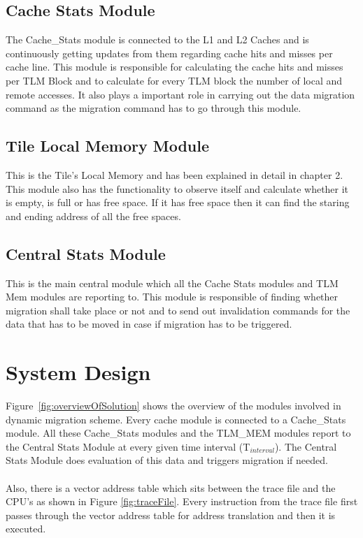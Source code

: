 \documentclass{listhesis}
\begin{document}
\subsection{Cache Stats Module}
The Cache{\_}Stats module is connected to the L1 and L2 Caches and is continuously getting updates from them regarding cache hits and misses per cache line. This module is responsible for calculating the cache hits and misses per TLM Block and to calculate for every TLM block the number of local and remote accesses. It also plays a important role in carrying out the data migration command as the migration command has to go through this module. 
\subsection{Tile Local Memory Module}
This is the Tile's Local Memory and has been explained in detail in chapter 2. This module also has the functionality to observe itself and calculate whether it is empty, is full or has free space. If it has free space then it can find the staring and ending address of all the free spaces. 
\subsection{Central Stats Module}
This is the main central module which all the Cache Stats modules and TLM Mem modules are reporting to. This module is responsible of finding whether migration shall take place or not and to send out invalidation commands for the data that has to be moved in case if migration has to be triggered. 

\section{System Design}
Figure~\ref{fig:overviewOfSolution} shows the overview of the modules involved in dynamic migration scheme. Every cache module is connected to a Cache{\_}Stats module. All these Cache{\_}Stats modules and the TLM{\_}MEM modules report to the Central Stats Module at every given time interval (T$_{interval}$). The Central Stats Module does evaluation of this data and triggers migration if needed. \\
\\
Also, there is a vector address table which sits between the trace file and the CPU's as shown in Figure \ref{fig:traceFile}. Every instruction from the trace file first passes through the vector address table for address translation and then it is executed.
\end{document}
